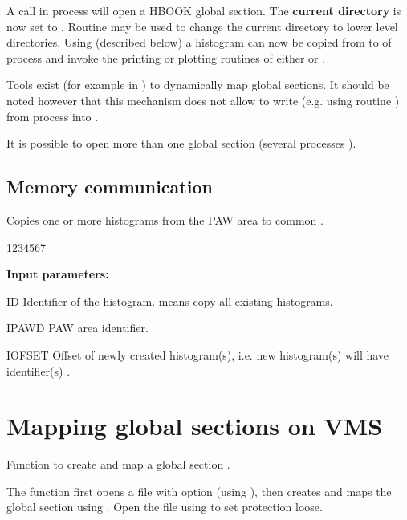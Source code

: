 A call 
in process  will open a HBOOK global section.
The {\bf current directory} is now set to .
Routine  may be used to change the current directory
to lower level directories.
Using  (described below) a histogram can now be copied
from  to  of process 
and invoke the printing or plotting routines
of either  or .
 
Tools exist
(for example in ) to dynamically map global sections.
It should be noted however that this mechanism does not allow
to write (e.g. using routine )
from process  into .
 
It is possible to open more than one global section (several processes
).

\subsection{Memory communication}


\Action Copies one or more histograms from the PAW area to common .
 
\begin{DLtt}{1234567}
\item[{\rm\bf Input parameters:}]
\item[ID] Identifier of the histogram.
           means copy all existing histograms.
\item[IPAWD] PAW area identifier.
\item[IOFSET] Offset of newly created histogram(s), i.e.
              new histogram(s) will have identifier(s) .
\end{DLtt}

\newpage

\section{Mapping global sections on VMS}


\Action  Function to create and map a global section .

The function first opens a file with  option 
(using ),
then creates and maps the global section using .
Open the file using  to set protection loose.

